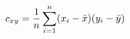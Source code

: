 \documentclass[preview]{standalone}
\begin{document}
\begin{align*}
\special{dvisvgm:raw <g id='unique000'>}c_{xy} = \frac{1}{n}\sum_{i=1}^{n}(x_i-\bar{x})(y_i-\bar{y})\special{dvisvgm:raw </g>}
\end{align*}
\end{document}
